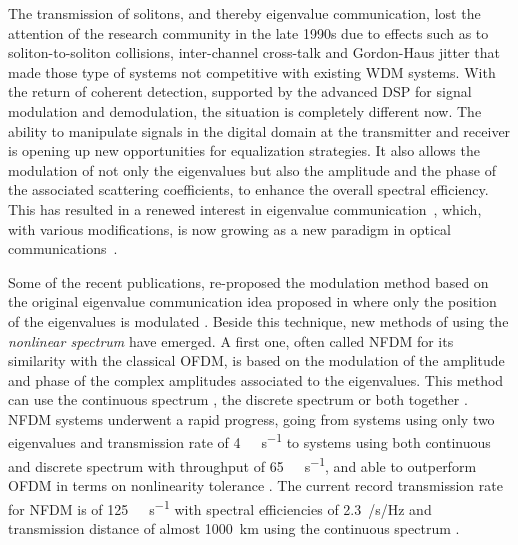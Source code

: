 The transmission of solitons, and thereby eigenvalue communication, lost the attention of the research community in the late 1990s due to effects such as to soliton-to-soliton collisions, inter-channel cross-talk and Gordon-Haus jitter \cite{hasegawa2003optical} that made those type of systems not competitive with existing \ac{WDM} systems.
With the return of coherent detection, supported by the advanced \ac{DSP} for signal modulation and demodulation, the situation is completely different now. The ability to manipulate signals in the digital domain at the transmitter and receiver is opening up new opportunities for equalization strategies. It also allows the modulation of not only the eigenvalues but also the amplitude and the phase of the associated scattering coefficients, to enhance the overall spectral efficiency. This has resulted in a renewed interest in eigenvalue communication~\cite{prilepsky2013nonlinear, terauchi2013eigenvalue, Yousefi2014}, which, with various modifications, is now growing as a new paradigm in optical communications~\cite{Turitsyn2017}.

Some of the recent publications, re-proposed the modulation method based on the
original eigenvalue communication idea proposed in \cite{Hasegawa} where only
the position of the eigenvalues is modulated \cite{terauchi2013eigenvalue,
dong2015nonlinear,gui2015impact,hari2016multieigenvalue,aref2016designaspects}.
Beside this technique, new methods of using the \textit{nonlinear spectrum} have
emerged. A first one, often called \ac{NFDM} for its similarity with the
classical \ac{OFDM}, is based on the modulation of the amplitude
and phase of the complex amplitudes associated to the eigenvalues. This method
can use the  continuous spectrum
\cite{le201764,Tavakkolnia:17,yangzhang2017nonlinear}, the discrete spectrum
\cite{Aref3,buelow2016transmission,gui2016phase,hari2016bi,
geisler2016experimental} or both together
\cite{tavakkolnia2015signalling,aref2016demonstration,le2017high}. \ac{NFDM}
systems underwent a rapid progress, going from systems using only two eigenvalues and transmission rate of \SI{4}{\giga\bit\per\second} \cite{Aref3} to systems using both continuous and discrete spectrum with throughput of \SI{65}{\giga\bit\per\second}, and able to outperform \ac{OFDM}  in terms on nonlinearity tolerance \cite{Le2017}. The  current record transmission rate for \ac{NFDM} is of \SI{125}{\giga\byte\per\second} with  spectral efficiencies of \SI{2.3}{\bit/\second/\hertz} and transmission distance of almost \SI{1000}{km} using the continuous spectrum \cite{le2017high} .

